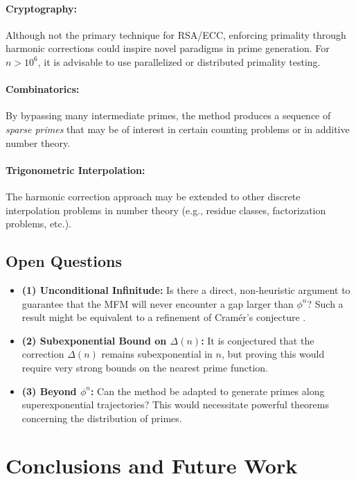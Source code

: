 \documentclass[12pt]{article}
\begin{document}
\paragraph{Cryptography:} Although not the primary technique for RSA/ECC, enforcing primality through harmonic corrections could inspire novel paradigms in prime generation. For $n>10^6$, it is advisable to use parallelized or distributed primality testing.
 
\paragraph{Combinatorics:} By bypassing many intermediate primes, the method produces a sequence of \emph{sparse primes} that may be of interest in certain counting problems or in additive number theory.

\paragraph{Trigonometric Interpolation:} The harmonic correction approach may be extended to other discrete interpolation problems in number theory (e.g., residue classes, factorization problems, etc.).

\subsection{Open Questions}
\begin{itemize}
    \item \textbf{(1) Unconditional Infinitude:} Is there a direct, non-heuristic argument to guarantee that the MFM will never encounter a gap larger than $\phi^n$? Such a result might be equivalent to a refinement of Cramér’s conjecture \cite{Cramer,Granville}.
    \item \textbf{(2) Subexponential Bound on $\Delta(n)$:} It is conjectured that the correction $\Delta(n)$ remains subexponential in $n$, but proving this would require very strong bounds on the nearest prime function.
    \item \textbf{(3) Beyond $\phi^n$:} Can the method be adapted to generate primes along superexponential trajectories? This would necessitate powerful theorems concerning the distribution of primes.
\end{itemize}

\section{Conclusions and Future Work}
\end{document}
